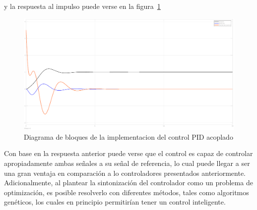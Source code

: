 y la respuesta al impulso puede verse en la figura~\ref{fig:controlS}
\begin{figure}[t]
  \label{fig:controlS}
  \includegraphics[scale=0.15]{Figuras/controlS}
  \caption{Diagrama de bloques de la implementacion del control PID acoplado} 
\end{figure}

Con base en la respuesta anterior puede verse que el control es capaz de controlar apropiadamente ambas
señales a su señal de referencia, lo cual puede llegar a ser una gran ventaja en comparación
a lo controladores presentados anteriormente. Adicionalmente, al plantear la sintonización del
controlador como un problema de optimización, es posible resolverlo con diferentes métodos, tales
como algoritmos genéticos, los cuales en principio permitirían tener un control inteligente.
